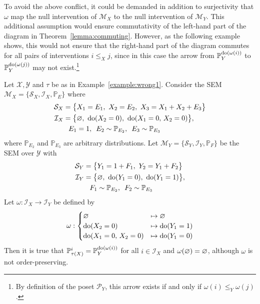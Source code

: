 To avoid the above conflict, it could be demanded in addition to surjectivity that $\omega$ map the null intervention of $\mathcal{M}_X$ to the null intervention of $\mathcal{M}_Y$.
This additional assumption would ensure commutativity of the left-hand part of the diagram in Theorem~\ref{lemma:commuting}.
However, as the following example shows, this would not ensure that the right-hand part of the diagram commutes for all pairs of interventions ${i \leq_X j}$, since in this case the arrow from $\mathbb{P}_Y^{\operatorname{do}(\omega(i))}$ to $\mathbb{P}_Y^{\operatorname{do}(\omega(j))}$ may not exist.\footnote{By definition of the poset $\mathcal{P}_Y$, this arrow exists if and only if $\omega(i) \leq_Y \omega(j)$.}

\medskip

\begin{example}\label{example:wrong2}
Let $\mathcal{X},\mathcal{Y}$ and $\tau$ be as in Example~\ref{example:wrong1}. Consider the SEM $\mathcal{M}_X=\{\mathcal{S}_X , \mathcal{I}_X, \mathbb{P}_E\}$ where
%
\begin{align*}
\mathcal{S}_X = \big\{ & X_1 = E_1,\ X_2 = E_2, \ X_3 = X_1 + X_2 + E_3 \big\} \\
%
\mathcal{I}_X = \big\{ & \nulli,\ \doop(X_2=0),\ \doop(X_1=0,\, X_2=0)\big\}, \\
%
E_1 & = 1,\ \,  E_2 \sim \mathbb{P}_{E_2}, \  \, E_3 \sim \mathbb{P}_{E_3}
\end{align*}
%
where $\mathbb{P}_{E_2}$ and $\mathbb{P}_{E_3}$ are arbitrary distributions.
%
Let $\mathcal{M}_Y =\{\mathcal{S}_Y , \mathcal{I}_Y, \mathbb{P}_F\}$ be the SEM over $\mathcal{Y}$ with
%
\begin{align*}
\mathcal{S}_Y = \big\{ & Y_1 =1+ F_1,\ Y_2 = Y_1 + F_2 \big\} \\
%
\mathcal{I}_Y = \big\{ & \nulli,\ \doop(Y_1=0),\ \doop(Y_1=1) \big\}, \\
%
F_1 &\sim \mathbb{P}_{E_2},  \  \, F_2 \sim \mathbb{P}_{E_3}
\end{align*}
%
Let ${\omega:\mathcal{I}_X \to \mathcal{I}_Y}$ be defined by
%
\begin{align*}
\omega: \begin{cases}
\varnothing &\mapsto \varnothing  \\
\operatorname{do}(X_2=0) &\mapsto \operatorname{do}(Y_1=1) \\
\operatorname{do}(X_1=0,\, X_2=0) &\mapsto \operatorname{do}(Y_1=0) \\
\end{cases}
\end{align*}
%
Then it is true that ${\mathbb{P}_{\tau(X)}^{i} = \mathbb{P}_Y^{\operatorname{do}(\omega(i))}}$ for all ${i \in \mathcal{I}_X}$ and $\omega(\varnothing)=\varnothing$, although $\omega$ is not order-preserving.
\end{example}

